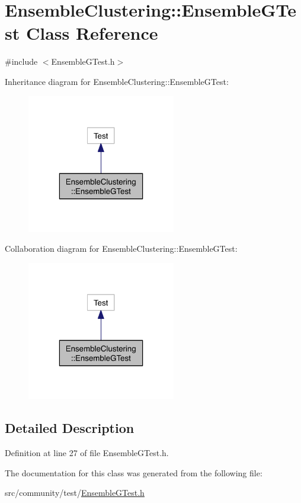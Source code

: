 \hypertarget{class_ensemble_clustering_1_1_ensemble_g_test}{\section{Ensemble\-Clustering\-:\-:Ensemble\-G\-Test Class Reference}
\label{class_ensemble_clustering_1_1_ensemble_g_test}
}


{\ttfamily \#include $<$Ensemble\-G\-Test.\-h$>$}



Inheritance diagram for Ensemble\-Clustering\-:\-:Ensemble\-G\-Test\-:
\nopagebreak
\begin{figure}[H]
\begin{center}
\leavevmode
\includegraphics[width=184pt]{class_ensemble_clustering_1_1_ensemble_g_test__inherit__graph}
\end{center}
\end{figure}


Collaboration diagram for Ensemble\-Clustering\-:\-:Ensemble\-G\-Test\-:
\nopagebreak
\begin{figure}[H]
\begin{center}
\leavevmode
\includegraphics[width=184pt]{class_ensemble_clustering_1_1_ensemble_g_test__coll__graph}
\end{center}
\end{figure}


\subsection{Detailed Description}


Definition at line 27 of file Ensemble\-G\-Test.\-h.



The documentation for this class was generated from the following file\-:\begin{DoxyCompactItemize}
\item 
src/community/test/\hyperlink{_ensemble_g_test_8h}{Ensemble\-G\-Test.\-h}\end{DoxyCompactItemize}
